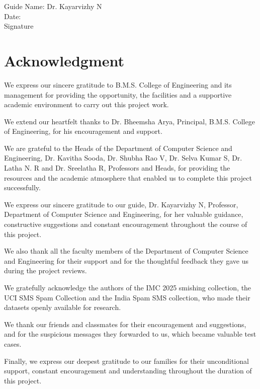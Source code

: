\vspace{1cm}
\noindent Guide Name: Dr. Kayarvizhy N\\
Date:\\
Signature
\clearpage

\chapter*{\centering Acknowledgment}
We express our sincere gratitude to B.M.S. College of Engineering and its management for providing the opportunity, the facilities and a supportive academic environment to carry out this project work.

We extend our heartfelt thanks to Dr. Bheemsha Arya, Principal, B.M.S. College of Engineering, for his encouragement and support.

We are grateful to the Heads of the Department of Computer Science and Engineering, Dr. Kavitha Sooda, Dr. Shubha Rao V, Dr. Selva Kumar S, Dr. Latha N. R and Dr. Sreelatha R, Professors and Heads, for providing the resources and the academic atmosphere that enabled us to complete this project successfully.

We express our sincere gratitude to our guide, Dr. Kayarvizhy N, Professor, Department of Computer Science and Engineering, for her valuable guidance, constructive suggestions and constant encouragement throughout the course of this project.

We also thank all the faculty members of the Department of Computer Science and Engineering for their support and for the thoughtful feedback they gave us during the project reviews.

We gratefully acknowledge the authors of the IMC 2025 smishing collection, the UCI SMS Spam Collection and the India Spam SMS collection, who made their datasets openly available for research.

We thank our friends and classmates for their encouragement and suggestions, and for the suspicious messages they forwarded to us, which became valuable test cases.

Finally, we express our deepest gratitude to our families for their unconditional support, constant encouragement and understanding throughout the duration of this project.
\clearpage

\clearpage
\setcounter{page}{1}
\renewcommand{\contentsname}{\centering Contents}
\tableofcontents
\clearpage
\setrealplain\pagestyle{fancy}
\setcounter{page}{1}
